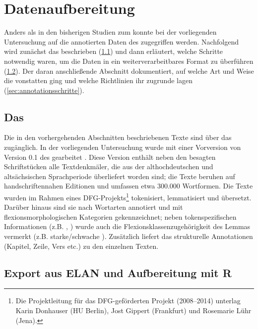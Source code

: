 \section{Datenaufbereitung} \label{sec:datenaufbereitung}

Anders als in den bisherigen Studien zum  konnte bei der vorliegenden Untersuchung auf die annotierten Daten des   zugegriffen werden. Nachfolgend wird zunächst das  beschrieben (\ref{sec:ddd}) und dann erläutert, welche Schritte notwendig waren, um die Daten in ein weiterverarbeitbares Format zu überführen (\ref{sec:aufbereitung}). Der daran anschließende Abschnitt dokumentiert, auf welche Art und Weise die  vonstatten ging und welche Richtlinien  ihr zugrunde lagen (\ref{sec:annotationsschritte}).

\subsection{Das } \label{sec:ddd}

Die in den vorhergehenden Abschnitten beschriebenen Texte sind über das   \parencite{Donhauser2015} zugänglich. In der vorliegenden Untersuchung wurde mit einer Vorversion von Version 0.1 des  gearbeitet \parencite{Donhauser2014}. Diese Version enthält neben den besagten Schriftstücken alle Textdenkmäler, die aus der althochdeutschen und altsächsischen Sprachperiode überliefert worden sind; die Texte beruhen auf handschriftennahen Editionen und umfassen etwa 300.000 Wortformen.
Die Texte wurden im Rahmen eines DFG-Projekts\footnote{Die Projektleitung für das DFG-geförderten Projekt (2008--2014) unterlag Karin Donhauser (HU Berlin), Jost Gippert (Frankfurt) und Rosemarie Lühr (Jena).} tokenisiert,  lemmatisiert und übersetzt. Darüber hinaus sind sie nach Wortarten  annotiert und mit flexionsmorphologischen  Kategorien gekennzeichnet; neben  tokenspezifischen Informationen (z.B. , ) wurde auch die Flexionsklassenzugehörigkeit  des Lemmas  vermerkt (z.B. starke/schwache ). Zusätzlich liefert das  strukturelle Annotationen  (Kapitel, Zeile, Vers etc.) zu den einzelnen Texten. 


\subsection{Export aus ELAN und Aufbereitung mit R}\label{sec:aufbereitung}

